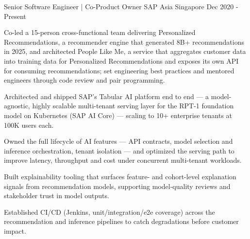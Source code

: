 

\begin{cventries}

  \cventry
    {Senior Software Engineer | Co-Product Owner} %
    {SAP Asia} %
    {Singapore} %
    {Dec 2020 - Present} %
    {
      \begin{cvitems} %
        \item {Co-led a 15-person cross-functional team delivering Personalized Recommendations, a recommender engine that generated 8B+ recommendations in 2025, and architected People Like Me, a service that aggregates customer data into training data for Personalized Recommendations and exposes its own API for consuming recommendations; set engineering best practices and mentored engineers through code review and pair programming.}
        \item {Architected and shipped SAP's Tabular AI platform end to end --- a model-agnostic, highly scalable multi-tenant serving layer for the RPT-1 foundation model on Kubernetes (SAP AI Core) --- scaling to 10+ enterprise tenants at 100K users each.}
        \item {Owned the full lifecycle of AI features --- API contracts, model selection and inference orchestration, tenant isolation --- and optimized the serving path to improve latency, throughput and cost under concurrent multi-tenant workloads.}
        \item {Built explainability tooling that surfaces feature- and cohort-level explanation signals from recommendation models, supporting model-quality reviews and stakeholder trust in model outputs.}
        \item {Established CI/CD (Jenkins, unit/integration/e2e coverage) across the recommendation and inference pipelines to catch degradations before customer impact.}
      \end{cvitems}
    }


\end{cventries}
